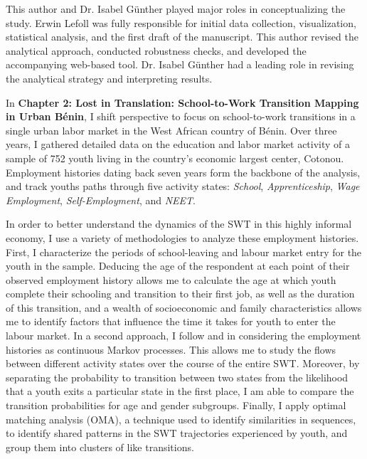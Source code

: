 \documentclass[
  a4paper, twoside, 12pt]{book}
\renewcommand{\hl}[1]{#1}
\begin{document}
\hl{This author and Dr. Isabel Günther played major roles in conceptualizing the study. Erwin Lefoll was fully responsible for initial data collection, visualization, statistical analysis, and the first draft of the manuscript. This author revised the analytical approach, conducted robustness checks, and developed the accompanying web-based tool. Dr. Isabel Günther had a leading role in revising the analytical strategy and interpreting results.}

In \textbf{Chapter 2: Lost in Translation: School-to-Work Transition Mapping in Urban Bénin}, I shift perspective to focus on school-to-work transitions in a single urban labor market in the West African country of Bénin. Over three years, I gathered detailed data on the education and labor market activity of a sample of 752 youth living in the country's economic largest center, Cotonou. Employment histories dating back seven years form the backbone of the analysis, and track youths paths through five activity states: \emph{School}, \emph{Apprenticeship}, \emph{Wage Employment}, \emph{Self-Employment}, and \emph{NEET}.

In order to better understand the dynamics of the SWT in this highly informal economy, I use a variety of methodologies to analyze these employment histories. First, I characterize the periods of school-leaving and labour market entry for the youth in the sample. Deducing the age of the respondent at each point of their observed employment history allows me to calculate the age at which youth complete their schooling and transition to their first job, as well as the duration of this transition, and a wealth of socioeconomic and family characteristics allows me to identify factors that influence the time it takes for youth to enter the labour market. In a second approach, I follow \textcite{bosch2007} and \textcite{cunningham2011} in considering the employment histories as continuous Markov processes. This allows me to study the flows between different activity states over the course of the entire SWT. Moreover, by separating the probability to transition between two states from the likelihood that a youth exits a particular state in the first place, I am able to compare the transition probabilities for age and gender subgroups. Finally, I apply optimal matching analysis (OMA), a technique used to identify similarities in sequences, to identify shared patterns in the SWT trajectories experienced by youth, and group them into clusters of like transitions.
\end{document}
